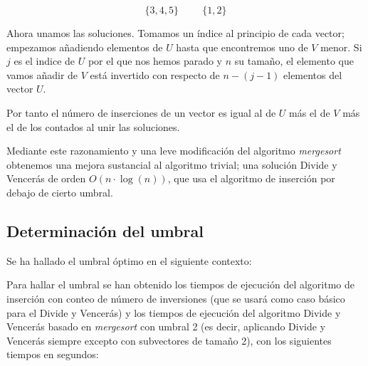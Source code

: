 $$\{3,4,5\} \hspace{1cm} \{1,2\}$$

Ahora unamos las soluciones. Tomamos un índice al principio de cada vector; empezamos añadiendo elementos de $U$ hasta que encontremos uno de $V$ menor. Si $j$ es el indice de $U$ por el que nos hemos parado y $n$ su tamaño, el elemento que vamos añadir de $V$ está invertido con respecto de $n-(j-1)$ elementos del vector $U$.

Por tanto el número de inserciones de un vector es igual al de $U$ más el de $V$ más el de los contados al unir las soluciones. 

Mediante este razonamiento y una leve modificación del algoritmo \textit{mergesort} obtenemos una mejora sustancial al algoritmo trivial; una solución Divide y Vencerás de orden $O(n\cdot \log(n))$, que usa el algoritmo de inserción por debajo de cierto umbral.

\subsection{Determinación del umbral}

Se ha hallado el umbral óptimo en el siguiente contexto:


Para hallar el umbral se han obtenido los tiempos de ejecución del algoritmo de inserción con conteo de número de inversiones (que se usará como caso básico para el Divide y Vencerás) y los tiempos de ejecución del algoritmo Divide y Vencerás basado en \textit{mergesort} con umbral 2 (es decir, aplicando Divide y Vencerás siempre excepto con subvectores de tamaño 2), con los siguientes tiempos en segundos:

